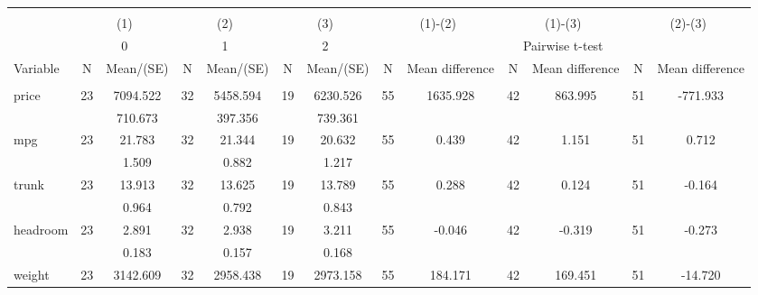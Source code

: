 
\begin{tabular}{@{\extracolsep{5pt}}lcccccccccccc}
\\[-1.8ex]\hline \hline \\[-1.8ex]
 & \multicolumn{2}{c}{(1)}  & \multicolumn{2}{c}{(2)}  & \multicolumn{2}{c}{(3)}  & \multicolumn{2}{c}{(1)-(2)} & \multicolumn{2}{c}{(1)-(3)} & \multicolumn{2}{c}{(2)-(3)} \\
 & \multicolumn{2}{c}{0}  & \multicolumn{2}{c}{1}  & \multicolumn{2}{c}{2}  & \multicolumn{6}{c}{Pairwise t-test}  \\
Variable & N & Mean/(SE) & N & Mean/(SE) & N & Mean/(SE) & N & Mean difference & N & Mean difference & N & Mean difference \\ \hline \\[-1.8ex] 
price   & 23    &  7094.522    & 32    &  5458.594    & 19    &  6230.526    & 55    &  1635.928    & 42    &   863.995    & 51    &  -771.933   \\
 &   &   710.673  &   &   397.356  &   &   739.361  &   &  &   &  &   &   \\
mpg   & 23    &    21.783    & 32    &    21.344    & 19    &    20.632    & 55    &     0.439    & 42    &     1.151    & 51    &     0.712   \\
 &   &     1.509  &   &     0.882  &   &     1.217  &   &  &   &  &   &   \\
trunk   & 23    &    13.913    & 32    &    13.625    & 19    &    13.789    & 55    &     0.288    & 42    &     0.124    & 51    &    -0.164   \\
 &   &     0.964  &   &     0.792  &   &     0.843  &   &  &   &  &   &   \\
headroom   & 23    &     2.891    & 32    &     2.938    & 19    &     3.211    & 55    &    -0.046    & 42    &    -0.319    & 51    &    -0.273   \\
 &   &     0.183  &   &     0.157  &   &     0.168  &   &  &   &  &   &   \\
weight   & 23    &  3142.609    & 32    &  2958.438    & 19    &  2973.158    & 55    &   184.171    & 42    &   169.451    & 51    &   -14.720   \\

\end{tabular}
